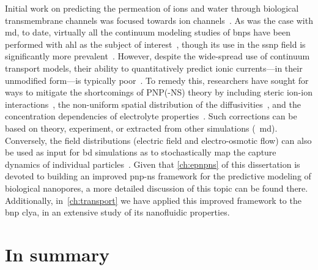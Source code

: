 Initial work on predicting the permeation of ions and water through biological transmembrane channels was
focused towards ion channels~\cite{Eisenberg-1996,Chen-1997,Corry-2003}. As was the case with \gls{md}, to
date, virtually all the continuum modeling studies of \glspl{bnp} have been performed with \gls{ahl} as the
subject of
interest~\cite{Noskov-2004,Cozmuta-2005,OKeeffe-2007,Simakov-2010,Pederson-2015,Simakov-2018,Aguilella-Arzo-2020},
though its use in the \gls{ssnp} field is significantly more
prevalent~\cite{Daiguji-2004,Cervera-2005,White-2008,Lu-2012,Chaudhry-2014,Laohakunakorn-2015,Hulings-2018,Rigo-2019,Melnikov-2020}.
However, despite the wide-spread use of continuum transport models, their ability to quantitatively predict
ionic currents---in their unmodified form---is typically poor~\cite{Corry-2000,Collins-2012}. To remedy this,
researchers have sought for ways to mitigate the shortcomings of {PNP}(-{NS}) theory by including steric
ion-ion interactions~\cite{Kilic-2007,Lu-2011,Liu-2020}, the non-uniform spatial distribution of the
diffusivities~\cite{Cozmuta-2005,Furini-2006,Simakov-2010,}, and the concentration dependencies of electrolyte
properties~\cite{Baldessari-2008-1,Burger-2012,Chen-2016}. Such corrections can be based on theory,
experiment, or extracted from other simulations (\eg~\gls{md}). Conversely, the field distributions (electric
field and electro-osmotic flow) can also be used as input for \gls{bd} simulations as to stochastically map
the capture dynamics of individual particles~\cite{Pederson-2015,Hulings-2018}. Given that \cref{ch:epnpns} of
this dissertation is devoted to building an improved \gls{pnp-ns} framework for the predictive modeling of
biological nanopores, a more detailed discussion of this topic can be found there. Additionally,
in~\cref{ch:transport} we have applied this improved framework to the \gls{bnp} \gls{clya}, in an extensive
study of its nanofluidic properties.



\section{In summary}
%

